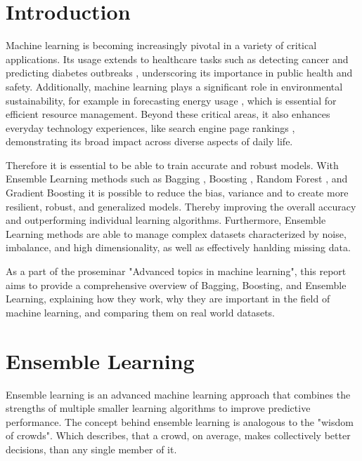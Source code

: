 \section{Introduction}
Machine learning is becoming increasingly pivotal in a variety of critical
applications. Its usage extends to healthcare tasks such as detecting cancer
\citep*{breast_cancer_prognosis} and predicting diabetes outbreaks
\citep*{diabetes_classification}, underscoring its importance in public health and safety. 
Additionally, machine learning plays a significant role in environmental sustainability,
for example in forecasting energy usage \citep*{energy_forecasting},
which is essential for efficient resource management. Beyond these critical
areas, it also enhances everyday technology experiences, like search engine page 
rankings \citep*{page_ranking}, demonstrating its broad impact across diverse aspects of daily life.

Therefore it is essential to be able to train accurate and robust models. With
Ensemble Learning methods such as Bagging \citep*{Breiman1996},
Boosting \citep*{Schapire1990}, Random Forest \citep*{breiman2001random},
and Gradient Boosting \citep*{breiman1997arcing, friedman2001greedy, friedman2002stochastic}
it is possible to reduce the bias, variance and to create more resilient, robust,
and generalized models. Thereby improving the overall accuracy and outperforming
individual learning algorithms.
Furthermore, Ensemble Learning methods are able to manage complex datasets
characterized by noise, imbalance, and high dimensionality, as well as effectively
hanlding missing data.

As a part of the proseminar "Advanced topics in machine learning", this report
aims to provide a comprehensive overview of Bagging, Boosting, and Ensemble 
Learning, explaining how they work, why they are important in the field of 
machine learning, and comparing them on real world datasets.

\section{Ensemble Learning}

Ensemble learning is an advanced machine learning approach that combines the 
strengths of multiple smaller learning algorithms to improve predictive 
performance. 
The concept behind ensemble learning is analogous to the "wisdom of crowds".
Which describes, that a crowd, on average, makes collectively better decisions,
than any single member of it.

